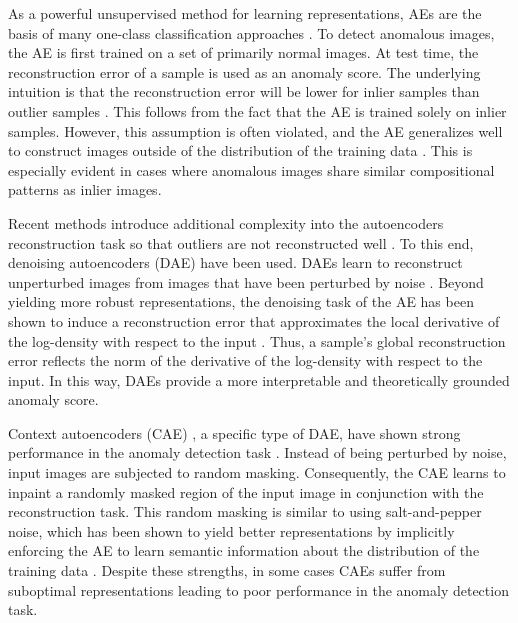 \documentclass[10pt,twocolumn,letterpaper]{article}
\begin{document}
As a powerful unsupervised method for learning representations, AEs are the basis of many one-class classification approaches \cite{chalapathy2019deep}. To detect anomalous images, the AE is first trained on a set of primarily normal images. At test time, the reconstruction error of a sample is used as an anomaly score. The underlying intuition is that the reconstruction error will be lower for inlier samples than outlier samples \cite{xia2015learning}. This follows from the fact that the AE is trained solely on inlier samples. However, this assumption is often violated, and the AE generalizes well to construct images outside of the distribution of the training data \cite{zong2018deep, gong2019memorizing}. This is especially evident in cases where anomalous images share similar compositional patterns as inlier images.

Recent methods introduce additional complexity into the autoencoders reconstruction task so that outliers are not reconstructed well \cite{abati2019latent, perera2019ocgan, zimmerer2018context}. To this end, denoising autoencoders (DAE) have been used. DAEs learn to reconstruct unperturbed images from images that have been perturbed by noise \cite{vincent2010stacked}. Beyond yielding more robust representations, the denoising task of the AE has been shown to induce a reconstruction error that approximates the local derivative of the log-density with respect to the input \cite{alain2014regularized}. Thus, a sample’s global reconstruction error reflects the norm of the derivative of the log-density with respect to the input. In this way, DAEs provide a more interpretable and theoretically grounded anomaly score.

Context autoencoders (CAE) \cite{pathak2016context}, a specific type of DAE, have shown strong performance in the anomaly detection task \cite{zimmerer2018context, baur2020autoencoders}. Instead of being perturbed by noise, input images are subjected to random masking. Consequently, the CAE learns to inpaint a randomly masked region of the input image in conjunction with the reconstruction task. This random masking is similar to using salt-and-pepper noise, which has been shown to yield better representations by implicitly enforcing the AE to learn semantic information about the distribution of the training data \cite{pathak2016context}. Despite these strengths, in some cases CAEs suffer from suboptimal representations leading to poor performance in the anomaly detection task. 
\end{document}
